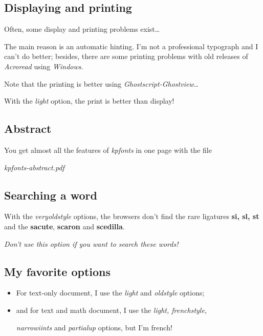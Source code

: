\documentclass[a4paper,11pt]{christophe}
\begin{document}
\subsection{Displaying and printing}

Often, some display and printing problems exist\dots

The main reason is an automatic hinting. I'm not a professional typograph and I can't do better;
besides, there are some printing problems with old releases of \textit{Acroread}\textregistered{} using \textit{Windows}\textregistered.

Note that the printing is better using \textit{Ghostscript-Ghostview}\textregistered\dots

With the \textit{light} option, the print is better than display!

\subsection{Abstract}

You get almost all the features of \textit{kpfonts} in one page with the file

\begin{center}\textit{kpfonts-abstract.pdf}\end{center}

\subsection{Searching a word}

With the \textit{veryoldstyle} options, the browsers don't find the rare ligatures \textbf{si, sl, st} and the \textbf{sacute}, \textbf{scaron} and \textbf{scedilla}. 

\begin{center}
\textit{Don't use this option if you want to search these words!}
\end{center}

\subsection{My favorite options}

\begin{itemize}
	\item For text-only document, I use the \textit{light} and \textit{oldstyle} options;
	\item and for text and math document, I use the \textit{light, frenchstyle},
				
				\textit{narrowiints} and \textit{partialup} options, but I'm french!
\end{itemize}
\end{document}
